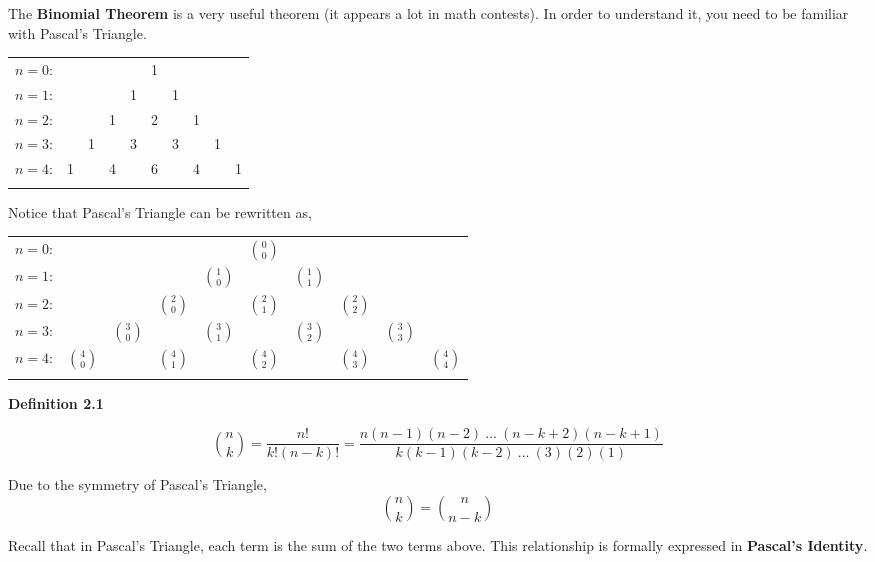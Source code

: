\documentclass{article}
\begin{document}
The \textbf{Binomial Theorem} is a very useful theorem (it appears a lot in math contests). In order to understand it, you need to be familiar with Pascal's Triangle.
\begin{center}
    \begin{tabular}{rccccccccc}
    $n=0$:&    &    &    &    &  1\\\noalign{\smallskip\smallskip}
    $n=1$:&    &    &    &  1 &    &  1\\\noalign{\smallskip\smallskip}
    $n=2$:&    &    &  1 &    &  2 &    &  1\\\noalign{\smallskip\smallskip}
    $n=3$:&    &  1 &    &  3 &    &  3 &    &  1\\\noalign{\smallskip\smallskip}
    $n=4$:&  1 &    &  4 &    &  6 &    &  4 &    &  1\\\noalign{\smallskip\smallskip}
    \end{tabular}
\end{center}
Notice that Pascal's Triangle can be rewritten as,
\begin{center}
    \begin{tabular}{rccccccccc}
    $n=0$:&    &    &    &    &  ${0 \choose 0}$\\\noalign{\smallskip\smallskip}
     $n=1$:&    &    &    &  ${1 \choose 0}$ & & ${1 \choose 1}$\\\noalign{\smallskip\smallskip}
    $n=2$:&    &    &  ${2 \choose 0}$ &    &  ${2 \choose 1}$ &    &  ${2 \choose 2}$\\\noalign{\smallskip\smallskip}
    $n=3$:&    &  ${3\choose0}$ &    &  ${3\choose1}$ &    &  ${3\choose2}$ &    &  ${3\choose3}$\\\noalign{\smallskip\smallskip}
    $n=4$:&  ${4\choose0}$ &    & ${4\choose1}$ &    &  ${4\choose2}$ &    &  ${4\choose3}$ &    &  ${4\choose4}$\\\noalign{\smallskip\smallskip}
    \end{tabular}
\end{center}

\bigskip

\noindent\textbf{Definition 2.1}
\begin{framed}
$${n \choose k} = \frac{n!}{k!(n-k)!} = \frac{n(n - 1)(n-2)\:...\: (n - k + 2)(n - k + 1)}{k(k-1)(k-2)\:...\:(3)(2)(1)}$$
\end{framed}
Due to the symmetry of Pascal's Triangle, 
$${n\choose k} = {n\choose n - k}$$

Recall that in Pascal's Triangle, each term is the sum of the two terms above. This relationship is formally expressed in \textbf{Pascal's Identity}. \\
\end{document}
